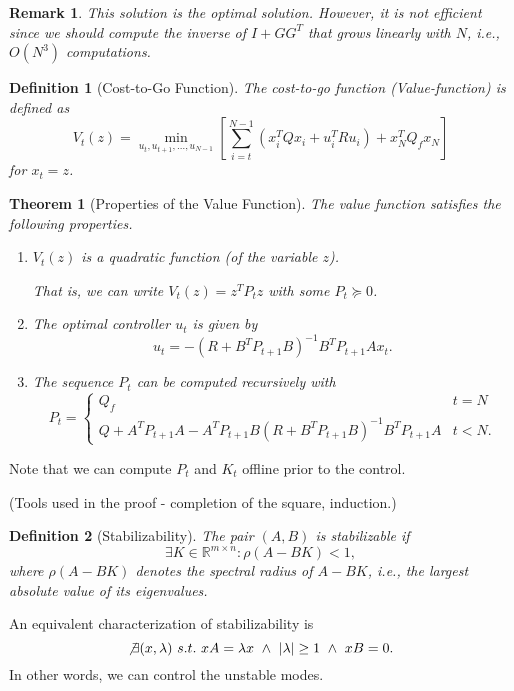 \documentclass[a4 paper]{article}
\numberwithin{equation}{section}
\theoremstyle{boldStyle}
\newtheorem{remark}{Remark}[section]
\theoremstyle{boldBlueStyle}
\theoremstyle{boldPurpleStyle}
\newtheorem{theorem}{Theorem}[section]
\theoremstyle{boldRedStyle}
\newtheorem{definition}{Definition}[section]
\theoremstyle{boldGreenStyle}
\begin{document}
  
\begin{remark}
  This solution is the optimal solution. However, it is not efficient since we should compute the inverse of
  \( I + G G^T \) that grows linearly with \( N \), i.e., \( O(N^3) \) computations. 
\end{remark}
  
\begin{definition}[Cost-to-Go Function]
The cost-to-go function (Value-function) is defined as
\[
V_t(z) = \min_{u_t, u_{t+1}, \ldots, u_{N-1}} \left[ \sum_{i=t}^{N-1} (x_i^T Q x_i + u_i^T R u_i) + x_N^T Q_f x_N \right]
\]
for \( x_t = z \).
\end{definition}


\begin{theorem}[Properties of the Value Function]
The value function satisfies the following properties.
\begin{enumerate}
    \item \( V_t(z) \) is a quadratic function (of the variable \( z \)). 
    
    That is, we can write \( V_t(z) = z^T P_t z \) with some \( P_t \succeq 0 \).
    
    \item The optimal controller \( u_t \) is given by
    \[
    u_t = -(R + B^T P_{t+1} B)^{-1} B^T P_{t+1} A x_t.
    \]
    \item The sequence \( P_t \) can be computed recursively with
    \[
    P_t = 
    \begin{cases} 
    Q_f & t = N \\
    Q + A^T P_{t+1} A - A^T P_{t+1} B (R + B^T P_{t+1} B)^{-1} B^T P_{t+1} A & t < N.
    \end{cases}
    \]
\end{enumerate}
\end{theorem}

Note that we can compute \( P_t \) and \( K_t \) offline prior to the control.

(Tools used in the proof - completion of the square, induction.)


\begin{definition}[Stabilizability]
The pair \( (A, B) \) is \textit{stabilizable} if
\[
\exists K \in \mathbb{R}^{m \times n} : \rho(A - BK) < 1,
\]
where \( \rho(A - BK) \) denotes the spectral radius of \( A - BK \), i.e., the largest absolute value of its eigenvalues.
\end{definition}

An equivalent characterization of stabilizability is
\[
\not\exists (x, \lambda) \ s.t. \ xA = \lambda x \ \land \ |\lambda| \ge 1 \ \land \ xB = 0.
\]
In other words, we can control the unstable modes. 
\end{document}
